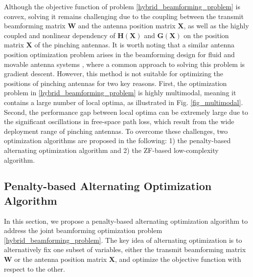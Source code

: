 Although the objective function of problem \eqref{hybrid_beamforming_problem} is convex, solving it remains challenging due to the coupling between the transmit beamforming matrix $\mathbf{W}$ and the antenna position matrix $\mathbf{X}$, as well as the highly coupled and nonlinear dependency of $\mathbf{H}(\mathbf{X})$ and $\mathbf{G}(\mathbf{X})$ on the position matrix $\mathbf{X}$ of the pinching antennas. It is worth noting that a similar antenna position optimization problem arises in the beamforming design for fluid and movable antenna systems \cite{zhu2023movable}, where a common approach to solving this problem is gradient descent. However, this method is not suitable for optimizing the positions of pinching antennas for two key reasons. First, the optimization problem in \eqref{hybrid_beamforming_problem} is highly multimodal, meaning it contains a large number of local optima, as illustrated in Fig. \ref{fig_multimodal}. Second, the performance gap between local optima can be extremely large due to the significant oscillations in free-space path loss, which result from the wide deployment range of pinching antennas. To overcome these challenges, two optimization algorithms are proposed in the following: 1) the penalty-based alternating optimization algorithm and 2) the ZF-based low-complexity algorithm.


\subsection{Penalty-based Alternating Optimization Algorithm}

In this section, we propose a penalty-based alternating optimization algorithm to address the joint beamforming optimization problem \eqref{hybrid_beamforming_problem}. The key idea of alternating optimization is to alternatively fix one subset of variables, either the transmit beamforming matrix $\mathbf{W}$ or the antenna position matrix $\mathbf{X}$, and optimize the objective function with respect to the other. 

